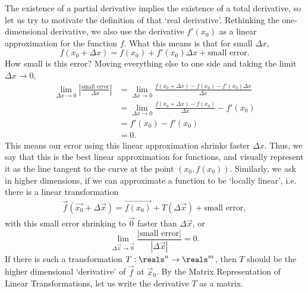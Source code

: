 The existence of a partial derivative implies the existence of a total derivative, so let us try to motivate the definition of that `real derivative'.
Rethinking the one-dimensional derivative, we also use the derivative $f'(x_0)$ as a linear approximation for the function $f$. What this means is that for small $\Delta x$, \[
f(x_0+\Delta x) = f(x_0)+ f'(x_0)\Delta x + \textrm{small error}.
\]
How small is this error? Moving everything else to one side and taking the limit $\Delta x\to 0$, \begin{align*}
    \lim_{\Delta x \to 0 }\left|\frac{\textrm{small error}}{\Delta x}\right| &= \lim_{\Delta x \to 0 }\frac{f(x_0+\Delta x) - f(x_0)- f'(x_0)\Delta x}{\Delta x}\\
    &=\lim_{\Delta x \to 0 }\frac{f(x_0+\Delta x) - f(x_0)}{\Delta x} - f'(x_0)\\
    &=f'(x_0)-f'(x_0)\\
    &=0.
\end{align*}
This means our error using this linear approximation shrinks faster $\Delta x$. Thus, we say that this is the best linear approximation for functions, and visually represent it as the line tangent to the curve at the point $(x_0,f(x_0))$.
Similarly, we ask in higher dimensions, if we can approximate a function to be `locally linear', i.e. there is a linear transformation \begin{align*}
    \vec{f}(\vec{x_0}+\Delta \vec{x}) = \vec{f(x_0)}+  T(\Delta \vec{x}) + \textrm{small error},
\end{align*}
with this small error shrinking to $\vec{0}$ faster than $\Delta \vec{x}$, or \[
\lim_{\Delta \vec{x}\to \vec{0}} \frac{|\textrm{small error}|}{|\Delta \vec{x}|}=0.
\]
If there is such a transformation $T:\reals^n\to\reals^m$, then $T$ should be the higher dimensional `derivative' of $\vec{f}$ at $\vec{x}_0$. 
By the Matrix Representation of Linear Transformations, let us write the derivative $T$ as a matrix. 
